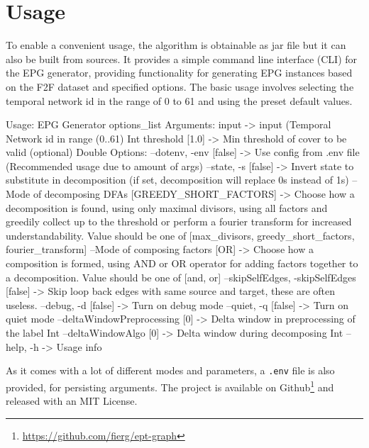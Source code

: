 \section{Usage}
\label{ch:Implementation:usage}
To enable a convenient usage, the algorithm is obtainable as jar file but it can also be built from sources.
It provides a simple command line interface (CLI) for the EPG generator, providing functionality for generating EPG instances based on the F2F dataset and specified options.
The basic usage involves selecting the temporal network id in the range of 0 to 61 and using the preset default values.

\begin{verbnobox}[\fontsize{10.5pt}{10.5pt}\selectfont]
Usage: EPG Generator options_list
Arguments: 
input -> input (Temporal Network id in range (0..61) { Int }
threshold [1.0] -> Min threshold of cover to be valid (optional) { Double }
Options: 
--dotenv, -env [false] -> Use config from .env file
		(Recommended usage due to amount of args) 
--state, -s [false] -> Invert state to substitute in decomposition
		(if set, decomposition will replace 0s instead of 1s) 
--Mode of decomposing DFAs [GREEDY_SHORT_FACTORS] -> Choose how
		a decomposition is found, using only maximal divisors,
		using all factors and greedily collect up to the threshold
		or perform a fourier transform for increased understandability.
		{ Value should be one of [max_divisors, greedy_short_factors,
 		fourier_transform] }
--Mode of composing factors [OR] -> Choose how a composition is formed,
		using AND or OR operator for adding factors together to
		a decomposition. { Value should be one of [and, or] }
--skipSelfEdges, -skipSelfEdges [false] -> Skip loop back edges
		with same source and target, these are often useless. 
--debug, -d [false] -> Turn on debug mode 
--quiet, -q [false] -> Turn on quiet mode 
--deltaWindowPreprocessing [0] -> Delta window
		 in preprocessing of the label { Int }
--deltaWindowAlgo [0] -> Delta window during decomposing { Int }
--help, -h -> Usage info 
\end{verbnobox}
As it comes with a lot of different modes and parameters, a \verb*|.env| file is also provided, for persisting arguments.
The project is available on Github\footnote{\url{https://github.com/fierg/ept-graph}} and released with an MIT License.

